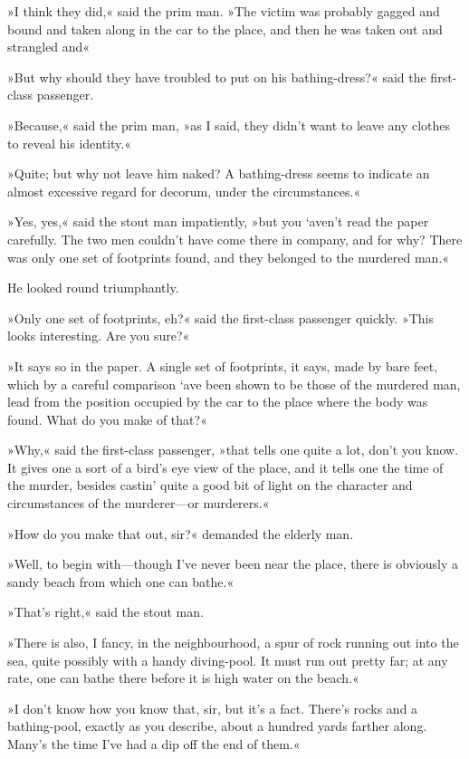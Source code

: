 »I think they did,« said the prim man. »The victim was probably gagged and bound and taken along in the car to the place, and then he was taken out and strangled and\longdash«

»But why should they have troubled to put on his bathing-dress?« said the first-class passenger.

»Because,« said the prim man, »as I said, they didn't want to leave any clothes to reveal his identity.«

»Quite; but why not leave him naked? A bathing-dress seems to indicate an almost excessive regard for decorum, under the circumstances.«

»Yes, yes,« said the stout man impatiently, »but you `aven't read the paper carefully. The two men couldn't have come there in company, and for why? There was only one set of footprints found, and they belonged to the murdered man.«

He looked round triumphantly.

»Only one set of footprints, eh?« said the first-class passenger quickly. »This looks interesting. Are you sure?«

»It says so in the paper. A single set of footprints, it says, made by bare feet, which by a careful comparison `ave been shown to be those of the murdered man, lead from the position occupied by the car to the place where the body was found. What do you make of that?«

»Why,« said the first-class passenger, »that tells one quite a lot, don't you know. It gives one a sort of a bird's eye view of the place, and it tells one the time of the murder, besides castin' quite a good bit of light on the character and circumstances of the murderer—or murderers.«

»How do you make that out, sir?« demanded the elderly man.

»Well, to begin with—though I've never been near the place, there is obviously a sandy beach from which one can bathe.«

»That's right,« said the stout man.

»There is also, I fancy, in the neighbourhood, a spur of rock running out into the sea, quite possibly with a handy diving-pool. It must run out pretty far; at any rate, one can bathe there before it is high water on the beach.«

»I don't know how you know that, sir, but it's a fact. There's rocks and a bathing-pool, exactly as you describe, about a hundred yards farther along. Many's the time I've had a dip off the end of them.«

